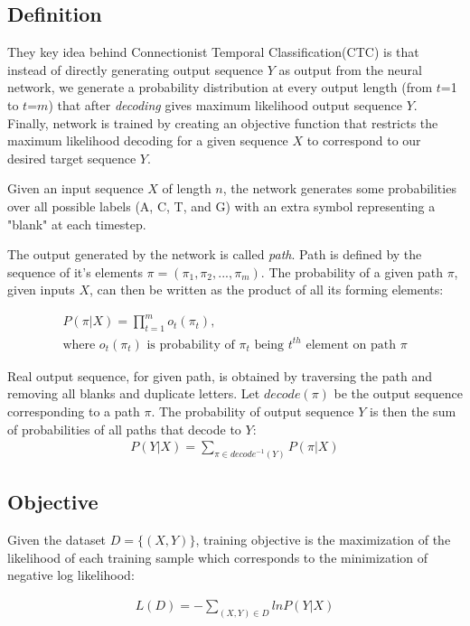 \documentclass[times, utf8, diplomski, numeric, english]{fer}
\begin{document}
\subsection{Definition}
They key idea behind Connectionist Temporal Classification(CTC)\cite{Graves:2006:CTC:1143844.1143891} is that instead of directly generating output sequence $Y$ as output from the neural network, we  generate a probability distribution at every output length (from $t$=1 to $t$=$m$) that after \textit{decoding} gives maximum likelihood output sequence $Y$. 
Finally, network is trained by creating an objective function that restricts the maximum likelihood decoding for a given sequence $X$ to correspond to our desired target sequence $Y$.


Given an input sequence $X$ of length $n$, the network generates some probabilities over all possible labels (A, C, T, and G) with an extra symbol representing a "blank" at each timestep. 

The output generated by the network is called \textit{path}. Path is defined by the sequence of it's elements $\pi = (\pi_1, \pi_2, ..., \pi_m)$.
The probability of a given path $\pi$, given inputs $X$, can then be written as the product of all its forming elements:

\begin{gather*}
P(\pi | X) = \prod_{t=1}^{m} o_t(\pi_t), \\
\text{where $o_t(\pi_t)$ is probability of $\pi_t$ being $t^{th}$ element on path $\pi$} 
\end{gather*}

Real output sequence, for given path, is obtained by traversing the path and removing all blanks and duplicate letters. Let $ decode(\pi) $ be the output sequence corresponding to a path $\pi$. The probability of output sequence $Y$ is then the sum of probabilities of all paths that decode to $Y$:
\begin{gather*}
P(Y | X) = \sum_{\pi \in decode^{-1}(Y)}^{} P(\pi | X)
\end{gather*}

\subsection{Objective}
Given the dataset $D = \{(X, Y)\}$, training objective is the maximization of the likelihood of each training sample which corresponds to the minimization of negative log likelihood:

\begin{gather*}
L(D) = - \sum_{(X,Y)\in D}^{} ln P(Y | X)
\end{gather*}
\end{document}
